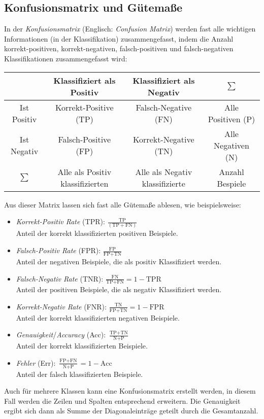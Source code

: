		\subsection{Konfusionsmatrix und Gütemaße}
			In der \emph{Konfusionsmatrix} (Englisch: \emph{Confusion Matrix}) werden fast alle wichtigen Informationen (in der Klassifikation) zusammengefasst, indem die Anzahl korrekt-positiven, korrekt-negativen, falsch-positiven und falsch-negativen Klassifikationen zusammengefasst wird:
			\begin{center}
				\begin{tabular}{c|c|c|c}
					            &    Klassifiziert als Positiv     &    Klassifiziert als Negativ    &      \(\sum\)      \\ \hline
					Ist Positiv &      Korrekt-Positive (TP)       &      Falsch-Negative (FN)       & Alle Positiven (P) \\ \hline
					Ist Negativ &       Falsch-Positive (FP)       &      Korrekt-Negative (TN)      & Alle Negativen (N) \\ \hline
					 \(\sum\)   & Alle als Positiv klassifizierten & Alle als Negativ klassifizierte &  Anzahl Bespiele
				\end{tabular}
			\end{center}
			Aus dieser Matrix lassen sich fast alle Gütemaße ablesen, wie beispielsweise:
			\begin{itemize}
				\item \emph{Korrekt-Positiv Rate} (TPR): \( \displaystyle  \frac{\text{TP}}{(\text{TP} + \text{FN})} \) \\
					Anteil der korrekt klassifizierten positiven Beispiele.
				\item \emph{Falsch-Positiv Rate} (FPR): \( \displaystyle  \frac{\text{FP}}{\text{FP} + \text{TN}} \) \\
					Anteil der negativen Beispiele, die als positiv Klassifiziert werden.
				\item \emph{Falsch-Negativ Rate} (TNR): \( \displaystyle  \frac{\text{FN}}{\text{TP} + \text{FN}} = 1 - \text{TPR} \) \\
					Anteil der positiven Beispiele, die als negativ Klassifiziert werden.
				\item \emph{Korrekt-Negativ Rate} (FNR): \( \displaystyle  \frac{\text{TN}}{\text{FP} + \text{TN}} = 1 - \text{FPR} \) \\
					Anteil der korrekt klassifizierten negativen Beispiele.
				\item \emph{Genauigkeit}/\emph{Accuracy} (Acc): \( \displaystyle  \frac{\text{TP} + \text{TN}}{\text{N} + \text{P}} \) \\
					Anteil der korrekt klassifizierten Beispiele.
				\item \emph{Fehler} (Err): \( \displaystyle  \frac{\text{FP} + \text{FN}}{\text{N} + \text{P}} = 1 - \text{Acc} \) \\
					Anteil der falsch klassifizierten Beispiele.
			\end{itemize}
			Auch für mehrere Klassen kann eine Konfusionsmatrix erstellt werden, in diesem Fall werden die Zeilen und Spalten entsprechend erweitern. Die Genauigkeit ergibt sich dann als Summe der Diagonaleinträge geteilt durch die Gesamtanzahl.

